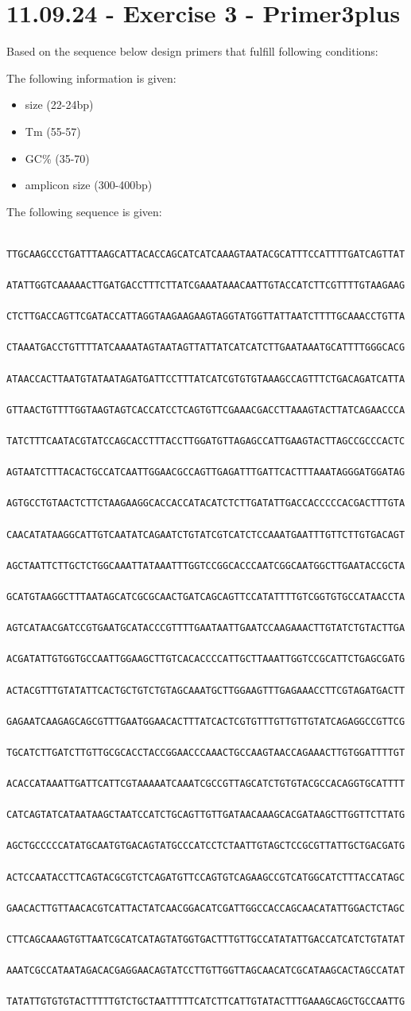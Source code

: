 \section{11.09.24 - Exercise 3 - Primer3plus}
Based on the sequence below design primers that fulfill following conditions:

The following information is given:

\begin{highlight}
    \begin{itemize}
        \item size (22-24bp)
        \item Tm (55-57)
        \item GC\% (35-70)
        \item amplicon size (300-400bp)
    \end{itemize}
\end{highlight}

The following sequence is given:

\begin{verbatim}
    TTGCAAGCCCTGATTTAAGCATTACACCAGCATCATCAAAGTAATACGCATTTCCATTTTGATCAGTTAT
    ATATTGGTCAAAAACTTGATGACCTTTCTTATCGAAATAAACAATTGTACCATCTTCGTTTTGTAAGAAG
    CTCTTGACCAGTTCGATACCATTAGGTAAGAAGAAGTAGGTATGGTTATTAATCTTTTGCAAACCTGTTA
    CTAAATGACCTGTTTTATCAAAATAGTAATAGTTATTATCATCATCTTGAATAAATGCATTTTGGGCACG
    ATAACCACTTAATGTATAATAGATGATTCCTTTATCATCGTGTGTAAAGCCAGTTTCTGACAGATCATTA
    GTTAACTGTTTTGGTAAGTAGTCACCATCCTCAGTGTTCGAAACGACCTTAAAGTACTTATCAGAACCCA
    TATCTTTCAATACGTATCCAGCACCTTTACCTTGGATGTTAGAGCCATTGAAGTACTTAGCCGCCCACTC
    AGTAATCTTTACACTGCCATCAATTGGAACGCCAGTTGAGATTTGATTCACTTTAAATAGGGATGGATAG
    AGTGCCTGTAACTCTTCTAAGAAGGCACCACCATACATCTCTTGATATTGACCACCCCCACGACTTTGTA
    CAACATATAAGGCATTGTCAATATCAGAATCTGTATCGTCATCTCCAAATGAATTTGTTCTTGTGACAGT
    AGCTAATTCTTGCTCTGGCAAATTATAAATTTGGTCCGGCACCCAATCGGCAATGGCTTGAATACCGCTA
    GCATGTAAGGCTTTAATAGCATCGCGCAACTGATCAGCAGTTCCATATTTTGTCGGTGTGCCATAACCTA
    AGTCATAACGATCCGTGAATGCATACCCGTTTTGAATAATTGAATCCAAGAAACTTGTATCTGTACTTGA
    ACGATATTGTGGTGCCAATTGGAAGCTTGTCACACCCCATTGCTTAAATTGGTCCGCATTCTGAGCGATG
    ACTACGTTTGTATATTCACTGCTGTCTGTAGCAAATGCTTGGAAGTTTGAGAAACCTTCGTAGATGACTT
    GAGAATCAAGAGCAGCGTTTGAATGGAACACTTTATCACTCGTGTTTGTTGTTGTATCAGAGGCCGTTCG
    TGCATCTTGATCTTGTTGCGCACCTACCGGAACCCAAACTGCCAAGTAACCAGAAACTTGTGGATTTTGT
    ACACCATAAATTGATTCATTCGTAAAAATCAAATCGCCGTTAGCATCTGTGTACGCCACAGGTGCATTTT
    CATCAGTATCATAATAAGCTAATCCATCTGCAGTTGTTGATAACAAAGCACGATAAGCTTGGTTCTTATG
    AGCTGCCCCCATATGCAATGTGACAGTATGCCCATCCTCTAATTGTAGCTCCGCGTTATTGCTGACGATG
    ACTCCAATACCTTCAGTACGCGTCTCAGATGTTCCAGTGTCAGAAGCCGTCATGGCATCTTTACCATAGC
    GAACACTTGTTAACACGTCATTACTATCAACGGACATCGATTGGCCACCAGCAACATATTGGACTCTAGC
    CTTCAGCAAAGTGTTAATCGCATCATAGTATGGTGACTTTGTTGCCATATATTGACCATCATCTGTATAT
    AAATCGCCATAATAGACACGAGGAACAGTATCCTTGTTGGTTAGCAACATCGCATAAGCACTAGCCATAT
    TATATTGTGTGTACTTTTTGTCTGCTAATTTTTCATCTTCATTGTATACTTTGAAAGCAGCTGCCAATTG
\end{verbatim}


